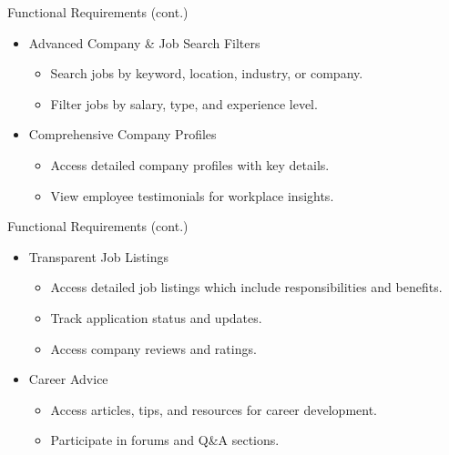 \documentclass{beamer}
\begin{document}
\begin{frame}{Functional Requirements (cont.)}
    \begin{itemize}
        \item Advanced Company \& Job Search Filters
        \begin{itemize}
            \item Search jobs by keyword, location, industry, or company.
            \item Filter jobs by salary, type, and experience level.
        \end{itemize}
        \item Comprehensive Company Profiles
        \begin{itemize}
            \item Access detailed company profiles with key details.
            \item View employee testimonials for workplace insights.
        \end{itemize}
    \end{itemize}
\end{frame}

\begin{frame}{Functional Requirements (cont.)}
    \begin{itemize}
        \item Transparent Job Listings
        \begin{itemize}
            \item Access detailed job listings which include responsibilities and benefits.
            \item Track application status and updates.
            \item Access company reviews and ratings.
        \end{itemize}
        \item Career Advice
        \begin{itemize}
            \item Access articles, tips, and resources for career development.
            \item Participate in forums and Q\&A sections.
        \end{itemize}
    \end{itemize}
\end{frame}
\end{document}
